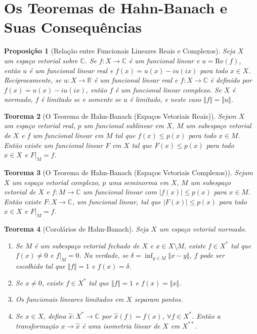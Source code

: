 \documentclass[12pt]{article}
\newtheorem{theorem}{Teorema}[section]
\newtheorem{proposition}[theorem]{Proposição}
\begin{document}
\section{Os Teoremas de Hahn-Banach e Suas Consequências}
\begin{multicols}{3}
\begin{proposition}[Relação entre Funcionais Lineares Reais e Complexos]
Seja $X$ um espaço vetorial sobre $\mathbb{C}$. Se $f: X \to \mathbb{C}$ é um funcional linear e $u = \text{Re}(f)$, então $u$ é um funcional linear real e $f(x) = u(x) - iu(ix)$ para todo $x \in X$.
Reciprocamente, se $u: X \to \mathbb{R}$ é um funcional linear real e $f: X \to \mathbb{C}$ é definido por $f(x) = u(x) - iu(ix)$, então $f$ é um funcional linear complexo. Se $X$ é normado, $f$ é limitado se e somente se $u$ é limitado, e neste caso $\Vert f \Vert = \Vert u \Vert$.
\end{proposition}

\begin{theorem}[O Teorema de Hahn-Banach (Espaços Vetoriais Reais)]
Sejam $X$ um espaço vetorial real, $p$ um funcional sublinear em $X$, $M$ um subespaço vetorial de $X$ e $f$ um funcional linear em $M$ tal que $f(x) \le p(x)$ para todo $x \in M$. Então existe um funcional linear $F$ em $X$ tal que $F(x) \le p(x)$ para todo $x \in X$ e $F|_M = f$.
\end{theorem}

\begin{theorem}[O Teorema de Hahn-Banach (Espaços Vetoriais Complexos)]
Sejam $X$ um espaço vetorial complexo, $p$ uma seminorma em $X$, $M$ um subespaço vetorial de $X$ e $f: M \to \mathbb{C}$ um funcional linear com $|f(x)| \le p(x)$ para $x \in M$.
Então existe $F: X \to \mathbb{C}$, um funcional linear, tal que $|F(x)| \le p(x)$ para todo $x \in X$ e $F|_M = f$.
\end{theorem}

\begin{theorem}[Corolários de Hahn-Banach]
Seja $X$ um espaço vetorial normado.
\begin{enumerate}
    \item Se $M$ é um subespaço vetorial fechado de $X$ e $x \in X \setminus M$, existe $f \in X^*$ tal que $f(x) \neq 0$ e $f|_M = 0$. Na verdade, se $\delta = \inf_{y \in M} \Vert x - y \Vert$, $f$ pode ser escolhido tal que $\Vert f \Vert = 1$ e $f(x) = \delta$.
    \item Se $x \neq 0$, existe $f \in X^*$ tal que $\Vert f \Vert = 1$ e $f(x) = \Vert x \Vert$.
    \item Os funcionais lineares limitados em $X$ separam pontos.
    \item Se $x \in X$, defina $\hat{x}: X^* \to \mathbb{C}$ por \mbox{$\hat{x}(f) = f(x)$}, $\forall f \in X^*$. Então a transformação $x \to \hat{x}$ é uma isometria linear de $X$ em $X^{**}$.
\end{enumerate}
\end{theorem}


\end{multicols}
\end{document}
